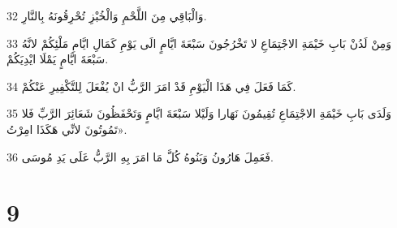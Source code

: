 \par 32 وَالْبَاقِي مِنَ اللَّحْمِ وَالْخُبْزِ تُحْرِقُونَهُ بِالنَّارِ.
\par 33 وَمِنْ لَدُنْ بَابِ خَيْمَةِ الاجْتِمَاعِ لا تَخْرُجُونَ سَبْعَةَ ايَّامٍ الَى يَوْمِ كَمَالِ ايَّامِ مَلْئِكُمْ لانَّهُ سَبْعَةَ ايَّامٍ يَمْلَا ايْدِيَكُمْ.
\par 34 كَمَا فَعَلَ فِي هَذَا الْيَوْمِ قَدْ امَرَ الرَّبُّ انْ يُفْعَلَ لِلتَّكْفِيرِ عَنْكُمْ.
\par 35 وَلَدَى بَابِ خَيْمَةِ الاجْتِمَاعِ تُقِيمُونَ نَهَارا وَلَيْلا سَبْعَةَ ايَّامٍ وَتَحْفَظُونَ شَعَائِرَ الرَّبِّ فَلا تَمُوتُونَ لانِّي هَكَذَا امِرْتُ».
\par 36 فَعَمِلَ هَارُونُ وَبَنُوهُ كُلَّ مَا امَرَ بِهِ الرَّبُّ عَلَى يَدِ مُوسَى.

\chapter{9}

